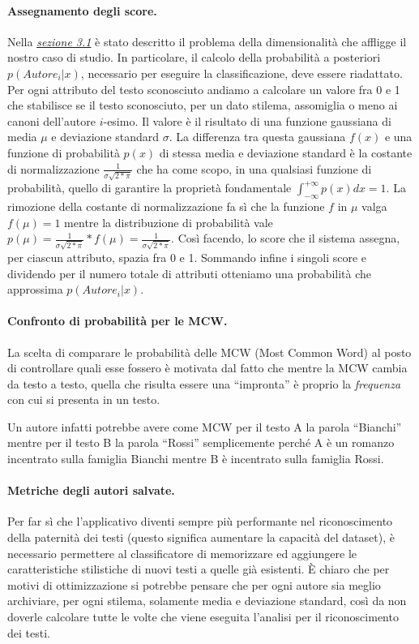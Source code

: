 \documentclass[titlepage]{article}
\begin{document}
\paragraph{Assegnamento degli score.}
Nella \hyperref[sec:3.1]{\textit{sezione 3.1}} è stato descritto il problema della dimensionalità che affligge il nostro caso di studio. In particolare, il calcolo della probabilità a posteriori $p(Autore_i|x)$, necessario per eseguire la classificazione, deve essere riadattato. Per ogni attributo del testo sconosciuto andiamo a calcolare un valore fra 0 e 1 che stabilisce se il testo sconosciuto, per un dato stilema, assomiglia o meno ai canoni dell'autore $i$-esimo. Il valore è il risultato di una funzione gaussiana di media $\mu$ e deviazione standard $\sigma$. La differenza tra questa gaussiana $f(x)$ e una funzione di probabilità $p(x)$ di stessa media e deviazione standard è la costante di normalizzazione $\frac{1}{\sigma \sqrt{2*\pi}}$ che ha come scopo, in una qualsiasi funzione di probabilità, quello di garantire la proprietà fondamentale $\int_{-\infty}^{+\infty}p(x)dx=1$. La rimozione della costante di normalizzazione fa sì che la funzione $f$ in $\mu$ valga $f(\mu) = 1$ mentre la distribuzione di probabilità vale $p(\mu) = \frac{1}{\sigma \sqrt{2*\pi}} * f(\mu) = \frac{1}{\sigma \sqrt{2*\pi}}$. Così facendo, lo score che il sistema assegna, per ciascun attributo, spazia fra 0 e 1. Sommando infine i singoli score e dividendo per il numero totale di attributi otteniamo una probabilità che approssima $p(Autore_i|x)$.

\paragraph{Confronto di probabilità per le MCW.}
La scelta di comparare le probabilità delle MCW (Most Common Word) al posto di controllare quali esse fossero è motivata dal fatto che mentre la MCW cambia da testo a testo, quella che risulta essere una ``impronta'' è proprio la \textit{frequenza} con cui si presenta in un testo.

Un autore infatti potrebbe avere come MCW per il testo A la parola ``Bianchi'' mentre per il testo B la parola ``Rossi'' semplicemente perché A è un romanzo incentrato sulla famiglia Bianchi mentre B è incentrato sulla famiglia Rossi.

\paragraph{Metriche degli autori salvate.}
Per far sì che l'applicativo diventi sempre più performante nel riconoscimento della paternità dei testi (questo significa aumentare la capacità del dataset), è necessario permettere al classificatore di memorizzare ed aggiungere le caratteristiche stilistiche di nuovi testi a quelle già esistenti. \`{E} chiaro che per motivi di ottimizzazione si potrebbe pensare che per ogni autore sia meglio archiviare, per ogni stilema, solamente media e deviazione standard, così da non doverle calcolare tutte le volte che viene eseguita l'analisi per il riconoscimento dei testi.
\end{document}
